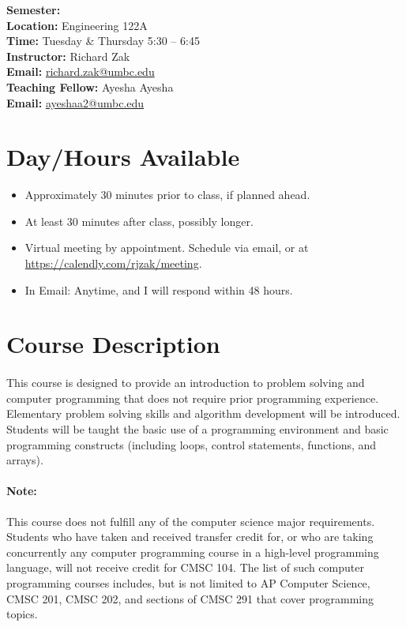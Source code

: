 \documentclass[letter,10pt]{article}
\begin{document}
\textbf{Semester:} \\
\textbf{Location:} Engineering 122A \\
\textbf{Time:} Tuesday \& Thursday 5:30 -- 6:45 \\
\textbf{Instructor:} Richard Zak \\
\textbf{Email:} \href{mailto:richard.zak@umbc.edu?Subject=CMSC104}{richard.zak@umbc.edu} \\
\textbf{Teaching Fellow:} Ayesha Ayesha \\
\textbf{Email:} \href{mailto:ayeshaa2@umbc.edu?Subject=CMSC104}{ayeshaa2@umbc.edu}

\section*{Day/Hours Available}
\begin{itemize}
\item Approximately 30 minutes prior to class, if planned ahead.
\item At least 30 minutes after class, possibly longer.
\item Virtual meeting by appointment. Schedule via email, or at \url{https://calendly.com/rjzak/meeting}.
\item In Email: Anytime, and I will respond within 48 hours.
\end{itemize}

\section*{Course Description}
\paragraph{}This course is designed to provide an introduction to problem solving and computer programming that does not require prior programming experience. Elementary problem solving skills and algorithm development will be introduced. Students will be taught the basic use of a programming environment and basic programming constructs (including loops, control statements, functions, and arrays).

\paragraph{Note:}This course does not fulfill any of the computer science major requirements. Students who have taken and received transfer credit for, or who are taking concurrently any computer programming course in a high-level programming language, will not receive credit for CMSC 104. The list of such computer programming courses includes, but is not limited to AP Computer Science, CMSC 201, CMSC 202, and sections of CMSC 291 that cover programming topics.
\end{document}
